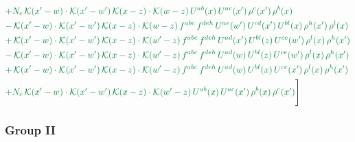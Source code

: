\documentclass[10pt]{article}
\numberwithin{equation}{section}
\begin{document}
\begin{align}
&{\color{JIM} +N_{c}\,\mathcal{K}(x'-w)\cdot\mathcal{K}(x'-w')\,\mathcal{K}(x-z)\cdot\mathcal{K}(w-z)\,U^{ab}(x)\,U^{ac}(x')\,\rho^{c}(x')\,\rho^{b}(x)} \notag\\
&{\color{JIM} -\,\mathcal{K}(x'-w)\cdot\mathcal{K}(x'-w')\,\mathcal{K}(x-z)\cdot\mathcal{K}(w-z)\,f^{abc}\,f^{deh}\,U^{ae}(w')\,U^{cd}(x')\,U^{bl}(x)\,\rho^{h}(x')\,\rho^{l}(x)} \notag\\
&{\color{JIM} +\,\mathcal{K}(x'-w)\cdot\mathcal{K}(x'-w')\,\mathcal{K}(x-z)\cdot\mathcal{K}(w'-z)\,f^{abc}\,f^{deh}\,U^{ad}(x')\,U^{bl}(z)\,U^{ce}(w')\,\rho^{l}(x)\,\rho^{h}(x')} \notag\\
&{\color{JIM} -\,\mathcal{K}(x'-w)\cdot\mathcal{K}(x'-w')\,\mathcal{K}(x-z)\cdot\mathcal{K}(w'-z)\,f^{abc}\,f^{deh}\,U^{ad}(w)\,U^{bl}(z)\,U^{ce}(w')\,\rho^{l}(x)\,\rho^{h}(x')} \notag\\
&{\color{JIM} +\,\mathcal{K}(x'-w)\cdot\mathcal{K}(x'-w')\,\mathcal{K}(x-z)\cdot\mathcal{K}(w'-z)\,f^{abc}\,f^{deh}\,U^{ad}(w)\,U^{bl}(x)\,U^{ce}(x')\,\rho^{l}(x)\,\rho^{h}(x')} \notag\\
&{\color{JIM} +N_{c}\,\mathcal{K}(x'-w)\cdot\mathcal{K}(x'-w')\,\mathcal{K}(x-z)\cdot\mathcal{K}(w'-z)\,U^{ab}(x)\,U^{ac}(x')\,\rho^{b}(x)\,\rho^{c}(x')}\Bigg] \end{align}
\subsubsection*{Group II}
\end{document}

